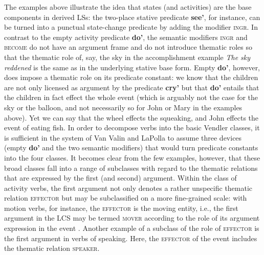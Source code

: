 The examples above illustrate the idea that states (and activities) are the base components in derived LSs: the two-place stative predicate \textbf{see'}, for instance, can be turned into a punctual state-change predicate by adding the modifier \textsc{ingr}. In contrast to the empty activity predicate \textbf{do'}, the semantic modifiers \textsc{ingr} and \textsc{become} do not have an argument frame and do not introduce thematic roles so that the thematic role of, say, the sky in the accomplishment example \textit{The sky reddened} is the same as in the underlying stative base form. Empty \textbf{do'}, however, does impose a thematic role on its predicate constant: we know that the children are not only licensed as argument by the predicate \textbf{cry'} but that \textbf{do'} entails that the children in fact effect the whole event (which is arguably not the case for the sky or the balloon, and not necessarily so for John or Mary in the examples above). Yet we can say that the wheel effects the squeaking, and John effects the event of eating fish. In order to decompose verbs into the basic Vendler classes, it is sufficient in the system of Van Valin and LaPolla to assume three devices (empty \textbf{do'} and the two semantic modifiers) that would turn predicate constants into the four classes. It becomes clear from the few examples, however, that these broad classes fall into a range of subclasses with regard to the thematic relations that are expressed by the first (and second) argument. Within the class of activity verbs, the first argument not only denotes a rather unspecific thematic relation \textsc{effector} but may be subclassified on a more fine-grained scale: with motion verbs, for instance, the \textsc{effector} is the moving entity, i.e., the first argument in the LCS may be termed \textsc{mover} according to the role of its argument expression in the event \citep[114f.]{van1997syntax}. Another example of a subclass of the role of \textsc{effector} is the first argument in verbs of speaking. Here, the \textsc{effector} of the event includes the thematic relation \textsc{speaker}. 

